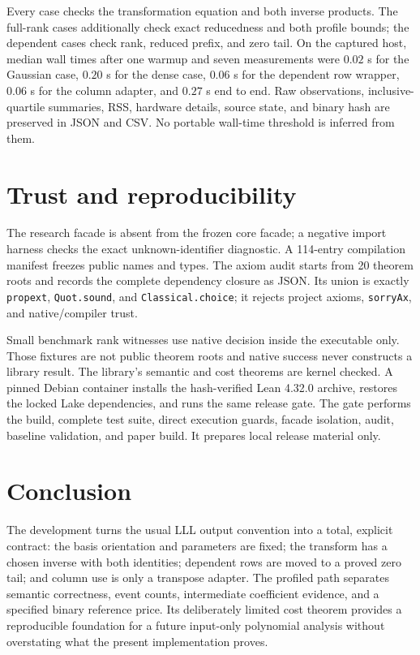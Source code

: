 \documentclass[11pt]{article}
\newcommand{\code}[1]{\texttt{#1}}
\begin{document}
Every case checks the transformation equation and both inverse products.  The
full-rank cases additionally check exact reducedness and both profile bounds;
the dependent cases check rank, reduced prefix, and zero tail.  On the
captured host, median wall times after one warmup and seven measurements were
$0.02$ s for the Gaussian case, $0.20$ s for the dense case, $0.06$ s for the
dependent row wrapper, $0.06$ s for the column adapter, and $0.27$ s end to
end.  Raw observations, inclusive-quartile summaries, RSS, hardware details,
source state, and binary hash are preserved in JSON and CSV.  No portable
wall-time threshold is inferred from them.

\section{Trust and reproducibility}

The research facade is absent from the frozen core facade; a negative import
harness checks the exact unknown-identifier diagnostic.  A 114-entry
compilation manifest freezes public names and types.  The axiom audit starts
from 20 theorem roots and records the complete dependency closure as JSON.
Its union is exactly \code{propext}, \code{Quot.sound}, and
\code{Classical.choice}; it rejects project axioms, \code{sorryAx}, and
native/compiler trust.

Small benchmark rank witnesses use native decision inside the executable
only.  Those fixtures are not public theorem roots and native success never
constructs a library result.  The library's semantic and cost theorems are
kernel checked.  A pinned Debian container installs the hash-verified Lean
4.32.0 archive, restores the locked Lake dependencies, and runs the same
release gate.  The gate performs the build, complete test suite, direct
execution guards, facade isolation, audit, baseline validation, and paper
build.  It prepares local release material only.

\section{Conclusion}

The development turns the usual LLL output convention into a total, explicit
contract: the basis orientation and parameters are fixed; the transform has a
chosen inverse with both identities; dependent rows are moved to a proved zero
tail; and column use is only a transpose adapter.  The profiled path separates
semantic correctness, event counts, intermediate coefficient evidence, and a
specified binary reference price.  Its deliberately limited cost theorem
provides a reproducible foundation for a future input-only polynomial analysis
without overstating what the present implementation proves.



\end{document}
